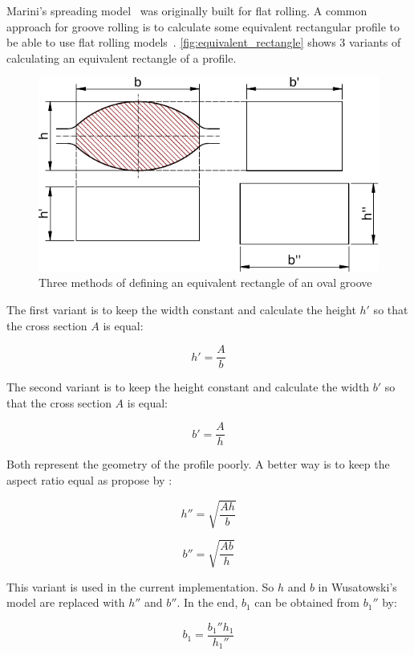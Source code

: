 \documentclass[11pt]{PyRollDocs}
\begin{document}
    Marini's spreading model~\cite{Marini1941} was originally built for flat rolling.
    A common approach for groove rolling is to calculate some equivalent rectangular profile to be able to use flat rolling models~\cite{Hensel1978, Spittel1984}.
    \autoref{fig:equivalent_rectangle} shows 3 variants of calculating an equivalent rectangle of a profile.

    \begin{figure}
        \centering
        \includegraphics[width=\linewidth]{equivalent_rectangle}
        \caption{Three methods of defining an equivalent rectangle of an oval groove}
        \label{fig:equivalent_rectangle}
    \end{figure}

    The first variant is to keep the width constant and calculate the height $h'$ so that the cross section $A$ is
    equal:

    \[
        h' = \frac{A}{b}
    \]

    The second variant is to keep the height constant and calculate the width $b'$ so that the cross section $A$ is
    equal:

    \[
        b' = \frac{A}{h}
    \]

    Both represent the geometry of the profile poorly.
    A better way is to keep the aspect ratio equal as propose by \textcite{Spittel1984}:

    \[
        h'' = \sqrt{\frac{A h}{b}}
    \]

    \[
        b'' = \sqrt{\frac{A b}{h}}
    \]

    This variant is used in the current implementation.
    So $h$ and $b$ in Wusatowski's model are replaced with $h''$ and $b''$.
    In the end, $b_1$ can be obtained from $b_1''$ by:

    \[
        b_1 = \frac{b_1'' h_1}{h_1''}
    \]
\end{document}
